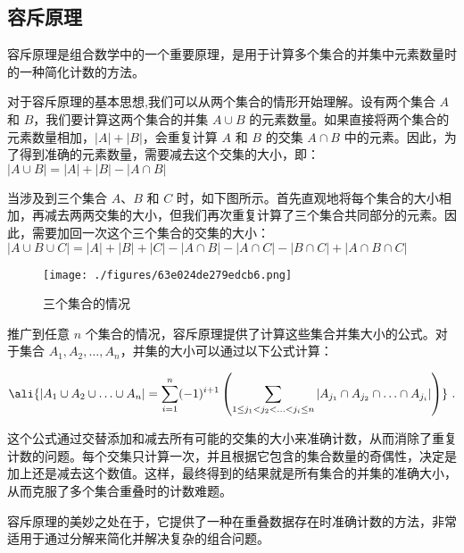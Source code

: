 
\subsection{容斥原理}

容斥原理是组合数学中的一个重要原理，是用于计算多个集合的并集中元素数量时的一种简化计数的方法。

对于容斥原理的基本思想,我们可以从两个集合的情形开始理解。设有两个集合 \(A\) 和 \(B\)，我们要计算这两个集合的并集 \(A \cup B\) 的元素数量。如果直接将两个集合的元素数量相加，\( |A| + |B| \)，会重复计算 \(A\) 和 \(B\) 的交集 \(A \cap B\) 中的元素。因此，为了得到准确的元素数量，需要减去这个交集的大小，即：
$|A \cup B| = |A| + |B| - |A \cap B|$

当涉及到三个集合 \(A\)、\(B\) 和 \(C\) 时，如下图所示。首先直观地将每个集合的大小相加，再减去两两交集的大小，但我们再次重复计算了三个集合共同部分的元素。因此，需要加回一次这个三个集合的交集的大小：
$|A \cup B \cup C| = |A| + |B| + |C| - |A \cap B| - |A \cap C| - |B \cap C| + |A \cap B \cap C|$

\begin{figure}[ht]
\centering
\texttt{[image: ./figures/63e024de279edcb6.png]}
\caption{三个集合的情况} \label{fig_inex_1}
\end{figure}


推广到任意 \(n\) 个集合的情况，容斥原理提供了计算这些集合并集大小的公式。对于集合 \(A_1, A_2, \ldots, A_n\)，并集的大小可以通过以下公式计算：



\begin{equation}\label{eq_inex_1}
\ali{    
|A_1 \cup A_2 \cup \ldots \cup A_n| = \sum_{i=1}^{n} (-1)^{i+1} \left( \sum_{1 \leq j_1 < j_2 < \ldots < j_i \leq n} |A_{j_1} \cap A_{j_2} \cap \ldots \cap A_{j_i}| \right)
}~.
\end{equation}


这个公式通过交替添加和减去所有可能的交集的大小来准确计数，从而消除了重复计数的问题。每个交集只计算一次，并且根据它包含的集合数量的奇偶性，决定是加上还是减去这个数值。这样，最终得到的结果就是所有集合的并集的准确大小，从而克服了多个集合重叠时的计数难题。

容斥原理的美妙之处在于，它提供了一种在重叠数据存在时准确计数的方法，非常适用于通过分解来简化并解决复杂的组合问题。